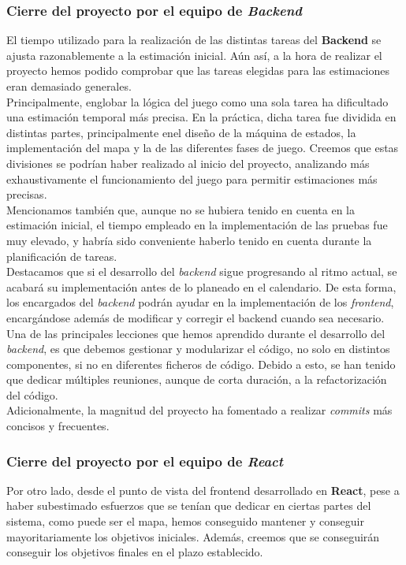\documentclass[11pt, a4paper, titlepage]{article}
\begin{document}
\subsubsection{Cierre del proyecto por el equipo de \textit{Backend}}
El tiempo utilizado para la realización de las distintas tareas del \textbf{Backend} se ajusta razonablemente a la estimación inicial.
Aún así, a la hora de realizar el proyecto hemos podido comprobar que las tareas elegidas para las estimaciones eran demasiado generales.\\

Principalmente, englobar la lógica del juego como una sola tarea ha dificultado una estimación temporal más precisa. En la práctica, dicha tarea fue dividida en distintas partes, principalmente enel diseño de la máquina de estados, la implementación del mapa y la de las diferentes fases de juego. Creemos que estas divisiones se podrían haber realizado al inicio del proyecto, analizando más exhaustivamente el funcionamiento del juego para permitir estimaciones más precisas. \\

Mencionamos también que, aunque no se hubiera tenido en cuenta en la estimación inicial, el tiempo empleado en la implementación de las pruebas fue muy elevado, y habría sido conveniente haberlo tenido en cuenta durante la planificación de tareas. \\

Destacamos que si el desarrollo del \textit{backend} sigue progresando al ritmo actual, se acabará su implementación antes de lo planeado en el calendario. De esta forma, los encargados del \textit{backend} podrán ayudar en la implementación de los \textit{frontend}, encargándose además de modificar y corregir el backend cuando sea necesario. \\

Una de las principales lecciones que hemos aprendido durante el desarrollo del \textit{backend}, es que debemos gestionar y modularizar el código, no solo en distintos componentes, si no en diferentes ficheros de código. Debido a esto, se han tenido que dedicar múltiples reuniones, aunque de corta duración, a la refactorización del código.\\

Adicionalmente, la magnitud del proyecto ha fomentado a realizar \textit{commits} más concisos y frecuentes. \\

\subsubsection{Cierre del proyecto por el equipo de \textit{React}}
Por otro lado, desde el punto de vista del frontend desarrollado en \textbf{React}, pese a haber subestimado esfuerzos que se tenían que dedicar en ciertas partes del sistema, como puede ser el mapa, hemos conseguido mantener y conseguir mayoritariamente los objetivos iniciales. Además, creemos que se conseguirán conseguir los objetivos finales en el plazo establecido. \\
\end{document}
